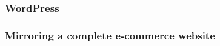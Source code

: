 






\subsubsection{WordPress}











\subsubsection{Mirroring a complete e-commerce website}











